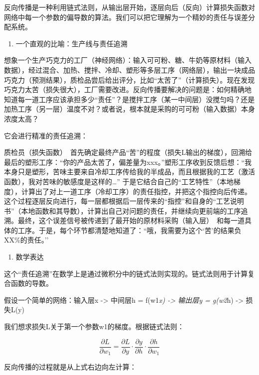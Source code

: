 反向传播是一种利用链式法则，从输出层开始，逐层向后（反向）计算损失函数对网络中每一个参数的偏导数的算法。我们可以把它理解为一个精妙的责任与误差分配系统。

\begin{enumerate}
\def\labelenumi{\arabic{enumi}.}
\tightlist
\item
  一个直观的比喻：生产线与责任追溯
\end{enumerate}

想象一个生产巧克力的工厂（神经网络）：输入可可粉、糖、牛奶等原材料（输入数据），经过混合、加热、搅拌、冷却、塑形等多层工序（网络层），输出一块成品巧克力（预测结果），质检品尝后给出评分，比如``太苦了''（计算损失）。现在发现巧克力太苦（损失很大），工厂需要改进。反向传播要解决的问题是：如何精确地知道每一道工序应该承担多少``责任''？是搅拌工序（某一中间层）没搅匀吗？还是加热工序（另一层）温度不对？或者说，根本就是采购的可可粉（输入数据）本身浓度太高？

它会进行精准的责任追溯：

质检员（损失函数）~首先确定最终产品``苦''的程度（损失L输出的梯度），回溯给最后的塑形工序：``你的产品太苦了，偏差量为xxx。''塑形工序收到反馈后想：``我本身只是塑形，苦味主要来自冷却工序传给我的半成品，而且根据我的工艺（激活函数），我对苦味的敏感度是这样的\ldots{}'' 于是它结合自己的``工艺特性''（本地梯度），计算出了对上一道工序（冷却工序）的责任指控，并把这个指控向后传递。这个过程逐层反向进行，每一层都根据后一层传来的``指控''和自身的``工艺说明书''（本地函数和其导数），计算出自己对问题的责任，并继续向更前端的工序追溯。最终，这个误差信号被传递到了最开始的原材料采购（输入层）~和每一道具体的工序。于是，每个环节都清楚地知道了：``哦，我需要为这个`苦'的结果负XX\%的责任。''

\begin{enumerate}
\def\labelenumi{\arabic{enumi}.}
\setcounter{enumi}{1}
\tightlist
\item
  数学表达
\end{enumerate}

这个``责任追溯''在数学上是通过微积分中的链式法则实现的。链式法则用于计算复合函数的导数。

假设一个简单的网络：输入层x -\textgreater{} 中间层h = f(w1\emph{x) -\textgreater{} 输出层y = g(w2}h) -\textgreater{} 损失L(y)

我们想求损失L关于第一个参数w1的梯度。根据链式法则：

\[
\frac{\partial L}{\partial w_1}=\frac{\partial L}{\partial y}\cdot\frac{\partial y}{\partial h}\cdot\frac{\partial h}{\partial w_1}
\]

反向传播的过程就是从上式右边向左计算：

